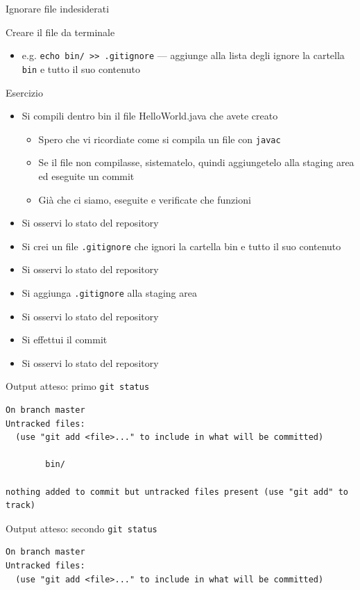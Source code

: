 \documentclass[xcolor=dvipsnames,presentation]{beamer}
\begin{document}
\begin{frame}{Ignorare file indesiderati}
\begin{block}{Creare il file da terminale}
\begin{itemize}
\begin{itemize}
                \item e.g. \texttt{echo bin/ >> .gitignore} --- aggiunge alla lista degli ignore la cartella \texttt{bin} e tutto il suo contenuto
            \end{itemize}
        \end{itemize}
    \end{block}
    \begin{block}{Esercizio}
        \begin{itemize}
            \item Si compili dentro bin il file HelloWorld.java che avete creato
            \begin{itemize}
                \item Spero che vi ricordiate come si compila un file con \texttt{javac}
                \item Se il file non compilasse, sistematelo, quindi aggiungetelo alla staging area ed eseguite un commit
                \item Già che ci siamo, eseguite e verificate che funzioni
            \end{itemize}
            \item Si osservi lo stato del repository
            \item Si crei un file \texttt{.gitignore} che ignori la cartella bin e tutto il suo contenuto
            \item Si osservi lo stato del repository
            \item Si aggiunga \texttt{.gitignore} alla staging area
            \item Si osservi lo stato del repository
            \item Si effettui il commit
            \item Si osservi lo stato del repository
        \end{itemize}
    \end{block}
    \begin{block}{Output atteso: primo \texttt{git status}}
        \begin{Verbatim}[fontsize=\scriptsize]
On branch master
Untracked files:
  (use "git add <file>..." to include in what will be committed)

        bin/

nothing added to commit but untracked files present (use "git add" to track)
        \end{Verbatim}
    \end{block}
    \begin{block}{Output atteso: secondo \texttt{git status}}
        \begin{Verbatim}[fontsize=\scriptsize]
On branch master
Untracked files:
  (use "git add <file>..." to include in what will be committed)


\end{Verbatim}
\end{block}
\end{frame}
\end{document}
